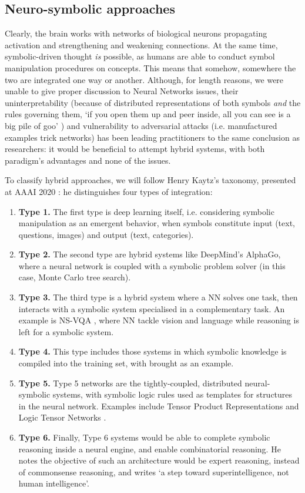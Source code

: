 \documentclass[../main.tex]{subfiles}
\begin{document}
\subsection{Neuro-symbolic approaches}
Clearly, the brain works with networks of biological neurons propagating activation and strengthening and weakening connections. At the same time, symbolic-driven thought \textit{is} possible, as humans are able to conduct symbol manipulation procedures on concepts. This means that somehow, somewhere the two are integrated one way or another. Although, for length reasons, we were unable to give proper discussion to Neural Networks issues, their uninterpretability (because of distributed representations of both symbols \textit{and} the rules governing them, \enquote*{if you open them up and peer inside,  all you can see is a big  pile of goo}  \parencite{mozerUsingRelevanceReduce1989}) and vulnerability to adversarial attacks (i.e. manufactured examples trick networks) has been leading practitioners to the same conclusion as researchers: it would be beneficial to attempt hybrid systems, with both paradigm's advantages and none of the issues.

To classify hybrid approaches, we will follow Henry Kaytz's taxonomy, presented at AAAI 2020 \parencite{kautzAAAI2020TalkSlides2020}: he distinguishes four types of integration:
\begin{enumerate}
    \item \textbf{Type 1.} The first type is deep learning itself, i.e. considering symbolic manipulation as an emergent behavior, when symbols constitute input (text, questions, images) and output (text, categories).
    \item \textbf{Type 2.} The second type are hybrid systems like DeepMind's AlphaGo, where a neural network is coupled with a symbolic problem solver (in this case, Monte Carlo tree search).
    \item \textbf{Type 3.} The third type is a hybrid system where a NN solves one task, then interacts with a symbolic system specialised in a complementary task. An example is NS-VQA \parencite{yiNeuralsymbolicVQADisentangling2018}, where NN tackle vision and language while reasoning is left for a symbolic system.
    \item \textbf{Type 4.} This type includes those systems in which symbolic knowledge is compiled into the training set, with  \parencite{lampleDeepLearningSymbolic2019} brought as an example.
    \item \textbf{Type 5.} Type 5 networks are the tightly-coupled, distributed neural-symbolic systems, with symbolic logic rules used as templates for structures in the neural network. Examples include Tensor Product Representations \parencite{mccoyRNNsImplicitlyImplement2019} and Logic Tensor Networks \parencite{serafiniLogicTensorNetworks2016}.
    \item \textbf{Type 6.} Finally, Type 6 systems would be able to complete symbolic reasoning inside a neural engine, and enable combinatorial reasoning. He notes the objective of such an architecture would be expert reasoning, instead of commonsense reasoning, and writes \enquote*{a step toward superintelligence, not human intelligence}.
\end{enumerate}
\end{document}

